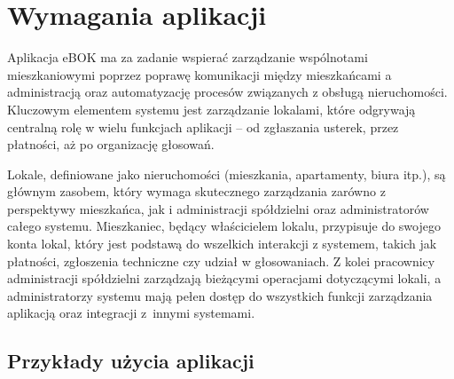 \section{Wymagania aplikacji}

Aplikacja eBOK ma za zadanie wspierać zarządzanie wspólnotami mieszkaniowymi poprzez poprawę komunikacji między mieszkańcami a administracją oraz automatyzację procesów związanych z obsługą nieruchomości. Kluczowym elementem systemu jest zarządzanie lokalami, które odgrywają centralną rolę w wielu funkcjach aplikacji – od zgłaszania usterek, przez płatności, aż po organizację głosowań.

Lokale, definiowane jako nieruchomości (mieszkania, apartamenty, biura itp.), są głównym zasobem, który wymaga skutecznego zarządzania zarówno z perspektywy mieszkańca, jak i administracji spółdzielni oraz administratorów całego systemu. Mieszkaniec, będący właścicielem lokalu, przypisuje do swojego konta lokal, który jest podstawą do wszelkich interakcji z systemem, takich jak płatności, zgłoszenia techniczne czy udział w głosowaniach. Z kolei pracownicy administracji spółdzielni zarządzają bieżącymi operacjami dotyczącymi lokali, a administratorzy systemu mają pełen dostęp do wszystkich funkcji zarządzania aplikacją oraz integracji z~innymi systemami.

\subsection{Przykłady użycia aplikacji}

